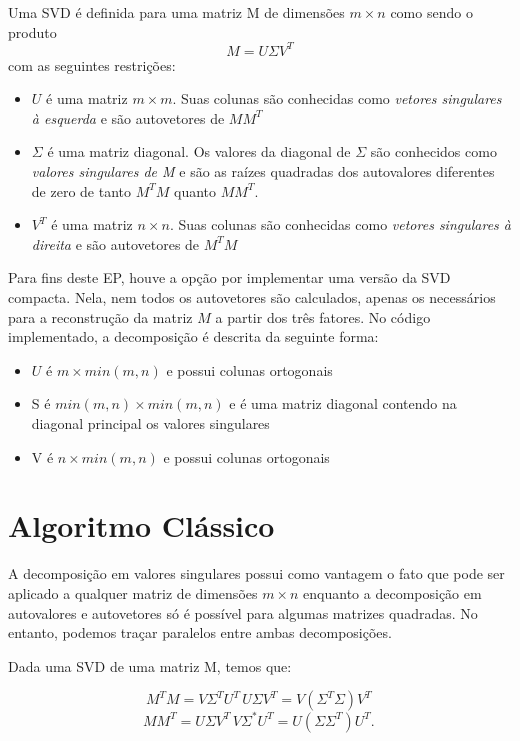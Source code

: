 \documentclass[brazil,times]{abnt}
\begin{document}
	Uma SVD é definida para uma matriz M de dimensões $m \times n$ como sendo o produto $$ M = U \Sigma V^T $$ com as seguintes restrições:
	
	\begin{itemize}
		\item $U$ é uma matriz $m \times m$. Suas colunas são conhecidas como \emph{vetores singulares à esquerda} e são autovetores de $MM^T$
		\item $\Sigma$ é uma matriz diagonal. Os valores da diagonal de $\Sigma$ são conhecidos como \emph{valores singulares de M} e são as raízes quadradas dos autovalores diferentes de zero de tanto $M^TM$ quanto $MM^T$.
		\item $V^T$ é uma matriz $n \times n$. Suas colunas são conhecidas como \emph{vetores singulares à direita} e são autovetores de $M^TM$
	\end{itemize}
	
	Para fins deste EP, houve a opção por implementar uma versão da SVD compacta. Nela, nem todos os autovetores são calculados, apenas os necessários para a reconstrução da matriz $M$ a partir dos três fatores. No código implementado, a decomposição é descrita da seguinte forma:
	
	\begin{itemize}
		\item $U$ é $m \times min(m,n)$ e possui colunas ortogonais
		\item S é $min(m,n) \times min(m,n)$ e é uma matriz diagonal contendo na diagonal principal os valores singulares
		\item V é $n \times min(m,n)$ e possui colunas ortogonais
	\end{itemize}

	\section{Algoritmo Clássico}
		A decomposição em valores singulares possui como vantagem o fato que pode ser aplicado a qualquer matriz de dimensões $m \times n$ enquanto a decomposição em autovalores e autovetores só é possível para algumas matrizes quadradas. No entanto, podemos traçar paralelos entre ambas decomposições.
		
		Dada uma SVD de uma matriz M, temos que:
		
    	$$M^{T} M = V \Sigma^{T} U^{T}\, U \Sigma V^{T} = V (\Sigma^{T} \Sigma) V^{T}\,$$
    	$$M M^{T} = U \Sigma V^{T} \, V \Sigma^{*} U^{T} = U (\Sigma \Sigma^{T}) U^{T}.\,$$
	
\end{document}
